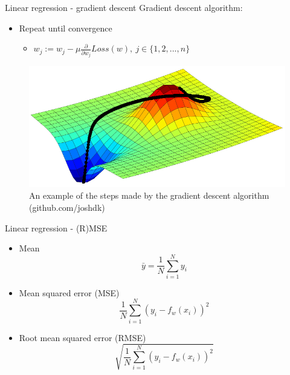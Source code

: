 \documentclass[aspectratio=169]{beamer}
\begin{document}
\begin{frame}{Linear regression - gradient descent}
    Gradient descent algorithm:
    \begin{itemize}
        \item Repeat until convergence
        \begin{itemize}
            \item $ w_j := w_j - \mu \frac{\partial }{\partial w_j} Loss(w), \ j \in \{1, 2, ..., n\}  $
        \end{itemize}
    \end{itemize}

    \begin{center}
        \begin{figure}
            \includegraphics[scale=0.58]{./images/gradientDescent.png}
            \caption{An example of the steps made by the gradient descent algorithm (github.com/joshdk)}
        \end{figure}
    \end{center}
\end{frame}
\begin{frame}{Linear regression - (R)MSE}
    \begin{itemize}
        \item Mean
            $$ \bar{y} = \frac{1}{N} \sum_{i=1}^{N} y_i $$
        \item Mean squared error (MSE)
        $$ \frac{1}{N} \sum_{i=1}^{N} (y_i - f_w(x_i))^ 2 $$
    \item Root mean squared error (RMSE)
        $$ \sqrt{\frac{1}{N} \sum_{i=1}^{N} (y_i - f_w(x_i))^ 2} $$
    \end{itemize}
\end{frame}
\end{document}
